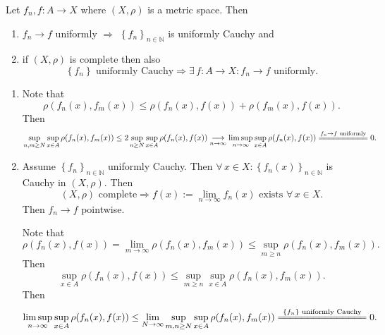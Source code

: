 \documentclass{notes}
\begin{document}
  \begin{lem}
    Let $f_n, f \colon A \to X$ where $(X, \rho)$ is a metric space.
    Then
    \begin{enumerate}
      \item $f_n \to f$ uniformly $\Rightarrow$ $\left \{ f_n \right \}_{n \in \mathbb N}$ is uniformly Cauchy and 

      \item if $(X, \rho)$ is complete then also 
      \[
        \left \{ f_n \right \} \text{ uniformly Cauchy} \Rightarrow \exists \, f \colon A \to X: f_n \to f \text{ uniformly}.
      \]
    \end{enumerate}
  \end{lem}
  
  \begin{prf}
    \begin{enumerate}
      \item Note that 
      \[
        \rho(f_n(x), f_m(x)) \leq \rho(f_n(x), f(x)) + \rho(f_m(x), f(x)).
      \]
      Then 
      \[
        \sup_{n, m \geq N} \sup_{x \in A} \rho(f_n(x), f_m(x)) \leq 2 \sup_{n \geq N} \sup_{x \in A} \rho(f_n(x), f(x)) \underset{n \to \infty}{\longrightarrow} \limsup_{n \to \infty} \sup_{x \in A} \rho(f_n(x), f(x)) \overset{f_n \to f \text{ uniformly}}{=\joinrel=\joinrel=\joinrel=\joinrel=\joinrel=\joinrel=\joinrel=\joinrel=\joinrel=} 0.
      \]
      
      \item Assume $\left \{ f_n \right \}_{n \in \mathbb N}$ uniformly Cauchy.
      Then $\forall \, x \in X: \left \{ f_n(x) \right \}_{n \in \mathbb N}$ is Cauchy in $(X, \rho)$.
      Then 
      \[
        (X, \rho) \text{ complete} \Rightarrow f(x) := \lim_{n \to \infty} f_n(x) \text{ exists } \forall \, x \in X.
      \]
      Then $f_n \to f$ pointwise.
      
      Note that 
      \[
        \rho(f_n(x), f(x)) = \lim_{m \to \infty} \rho(f_n(x), f_m(x)) \leq \sup_{m \geq n} \rho(f_n(x), f_m(x)).
      \]
      Then 
      \[
        \sup_{x \in A} \rho(f_n(x), f(x)) \leq \sup_{m \geq n} \sup_{x \in A} \rho(f_n(x), f_m(x)).
      \]
      Then 
      \[
        \limsup_{n \to \infty} \sup_{x \in A} \rho(f_n(x), f(x)) \leq \lim_{N \to \infty} \sup_{m, n \geq N} \sup_{x \in A} \rho(f_n(x), f_m(x)) \overset{\left \{ f_n \right \} \text{ uniformly Cauchy}}{=\joinrel=\joinrel=\joinrel=\joinrel=\joinrel=\joinrel=\joinrel=\joinrel=\joinrel=\joinrel=\joinrel=\joinrel=\joinrel=\joinrel=} 0.
      \]
    \end{enumerate}
  \end{prf}
  
\end{document}
